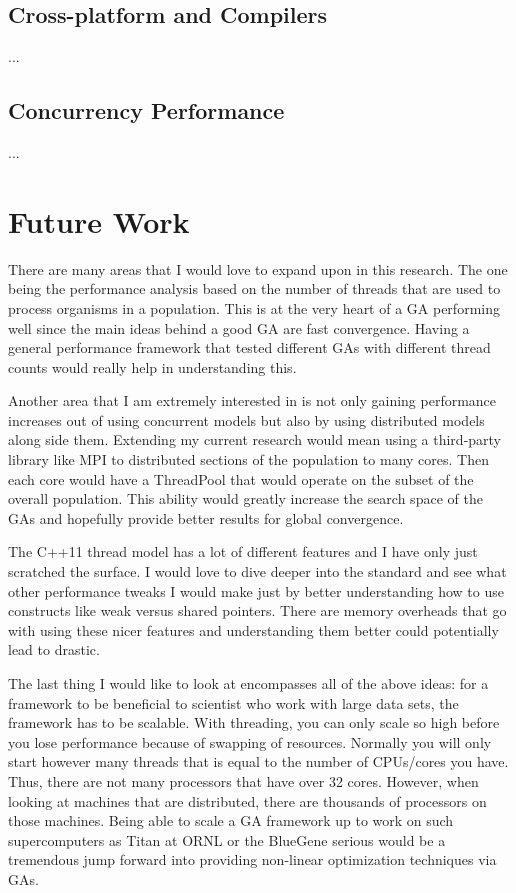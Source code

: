 \documentclass{acm_proc_article-sp}
\begin{document}
\subsection{Cross-platform and Compilers}

...


\subsection{Concurrency Performance}

...


%
%
\section{Future Work}

There are many areas that I would love to expand upon in this research. The one being the performance analysis based on the number of threads that are used to process organisms in a population. This is at the very heart of a GA performing well since the main ideas behind a good GA are fast convergence. Having a general performance framework that tested different GAs with different thread counts would really help in understanding this.

Another area that I am extremely interested in is not only gaining performance increases out of using concurrent models but also by using distributed models along side them. Extending my current research would mean using a third-party library like MPI to distributed sections of the population to many cores. Then each core would have a ThreadPool that would operate on the subset of the overall population. This ability would greatly increase the search space of the GAs and hopefully provide better results for global convergence.

The C++11 thread model has a lot of different features and I have only just scratched the surface. I would love to dive deeper into the standard and see what other performance tweaks I would make just by better understanding how to use constructs like weak versus shared pointers. There are memory overheads that go with using these nicer features and understanding them better could potentially lead to drastic.

The last thing I would like to look at encompasses all of the above ideas: for a framework to be beneficial to scientist who work with large data sets, the framework has to be scalable. With threading, you can only scale so high before you lose performance because of swapping of resources. Normally you will only start however many threads that is equal to the number of CPUs/cores you have. Thus, there are not many processors that have over 32 cores. However, when looking at machines that are distributed, there are thousands of processors on those machines. Being able to scale a GA framework up to work on such supercomputers as Titan at ORNL or the BlueGene serious would be a tremendous jump forward into providing non-linear optimization techniques via GAs.


%
%




%
%
\balancecolumns


%
%
\end{document}
